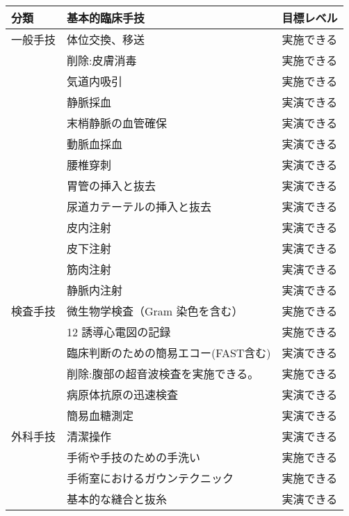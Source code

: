 \documentclass[
]{ltjsarticle}
\begin{document}
\begin{xltabular}{\linewidth}{XXX}
\caption{\label{tbl:基本的臨床手技}} \\
\toprule
分類 & 基本的臨床手技 & 目標レベル \\
\midrule
\endhead
一般手技 & 体位交換、移送 & 実施できる \\
 & 削除:皮膚消毒 & 実施できる \\
 & 気道内吸引 & 実施できる \\
 & 静脈採血 & 実演できる \\
 & 末梢静脈の血管確保 & 実演できる \\
 & 動脈血採血 & 実演できる \\
 & 腰椎穿刺 & 実演できる \\
 & 胃管の挿入と抜去 & 実演できる \\
 & 尿道カテーテルの挿入と抜去 & 実演できる \\
 & 皮内注射 & 実演できる \\
 & 皮下注射 & 実演できる \\
 & 筋肉注射 & 実演できる \\
 & 静脈内注射 & 実演できる \\
検査手技 & 微生物学検査（Gram 染色を含む） & 実施できる \\
 & 12 誘導心電図の記録 & 実施できる \\
 & 臨床判断のための簡易エコー(FAST含む) & 実演できる \\
 & 削除:腹部の超音波検査を実施できる。 & 実施できる \\
 & 病原体抗原の迅速検査 & 実演できる \\
 & 簡易血糖測定 & 実演できる \\
外科手技 & 清潔操作 & 実演できる \\
 & 手術や手技のための手洗い & 実施できる \\
 & 手術室におけるガウンテクニック & 実施できる \\
 & 基本的な縫合と抜糸 & 実演できる \\
\bottomrule
\end{xltabular}
\end{document}

